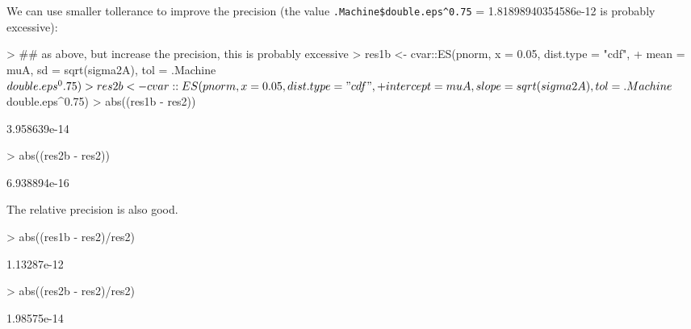 \documentclass[nojss,article]{jss}
\begin{document}
We can use smaller tollerance to improve the precision
(the value \verb+.Machine$double.eps^0.75+ = 1.81898940354586e-12 is probably excessive):
\begin{Schunk}
\begin{Sinput}
> ## as above, but increase the precision, this is probably excessive
> res1b <- cvar::ES(pnorm, x = 0.05, dist.type = "cdf",
+                    mean = muA, sd = sqrt(sigma2A), tol = .Machine$double.eps^0.75)
> res2b <- cvar::ES(pnorm, x = 0.05, dist.type = "cdf",
+                    intercept = muA, slope = sqrt(sigma2A), tol = .Machine$double.eps^0.75)
> abs((res1b - res2))
\end{Sinput}
\begin{Soutput}
[1] 3.958639e-14
\end{Soutput}
\begin{Sinput}
> abs((res2b - res2))
\end{Sinput}
\begin{Soutput}
[1] 6.938894e-16
\end{Soutput}
\end{Schunk}

The relative precision is also good.
\begin{Schunk}
\begin{Sinput}
> abs((res1b - res2)/res2)
\end{Sinput}
\begin{Soutput}
[1] 1.13287e-12
\end{Soutput}
\begin{Sinput}
> abs((res2b - res2)/res2)
\end{Sinput}
\begin{Soutput}
[1] 1.98575e-14
\end{Soutput}
\end{Schunk}

\newpage{}

\end{document}
